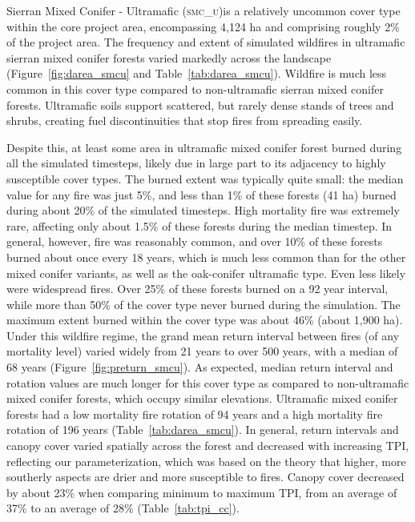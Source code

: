Sierran Mixed Conifer - Ultramafic (\textsc{smc\_u})is a relatively uncommon cover type within the core project area, encompassing 4,124 ha and comprising roughly 2\% of the project area. The frequency and extent of simulated wildfires in ultramafic sierran mixed conifer forests varied markedly across the landscape (Figure~\ref{fig:darea_smcu} and Table~\ref{tab:darea_smcu}).  %
%
Wildfire is much less common in this cover type compared to non-ultramafic sierran mixed conifer forests. Ultramafic soils support scattered, but rarely dense stands of trees and shrubs, creating fuel discontinuities that stop fires from spreading easily. 

Despite this, at least some area in ultramafic mixed conifer forest burned during all the simulated timesteps, likely due in large part to its adjacency to highly susceptible cover types. The burned extent was typically quite small: the median value for any fire was just 5\%, and less than 1\% of these forests (41 ha) burned during about 20\% of the simulated timesteps. High mortality fire was extremely rare, affecting only about 1.5\% of these forests during the median timestep. In general, however, fire was reasonably common, and over  10\% of these forests burned about once every 18 years, which is much less common than for the other mixed conifer variants, as well as the oak-conifer ultramafic type. Even less likely were widespread fires. Over 25\% of these forests burned on a 92 year interval, while more than 50\% of the cover type never burned during the simulation. The maximum extent burned within the cover type was about 46\% (about 1,900 ha). 
%
Under this wildfire regime, the grand mean return interval between fires (of any mortality level) varied widely from 21 years to over 500 years, with a median of 68 years (Figure~\ref{fig:preturn_smcu}). As expected, median return interval and rotation values are much longer for this cover type as compared to non-ultramafic mixed conifer forests, which occupy similar elevations. Ultramafic mixed conifer forests had a low mortality fire rotation of 94 years and a high mortality fire rotation of 196 years (Table~\ref{tab:darea_smcu}).  %
%
In general, return intervals and canopy cover varied spatially across the forest and decreased with increasing TPI, reflecting our parameterization, which was based on the theory that higher, more southerly aspects are drier and more susceptible to fires. Canopy cover decreased by about 23\% when comparing minimum to maximum TPI, from an average of 37\% to an average of 28\% (Table~\ref{tab:tpi_cc}). 

